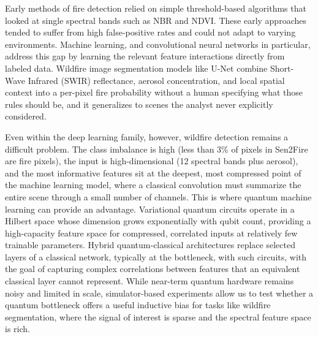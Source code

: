 \documentclass{article}
\begin{document}
Early methods of fire detection relied on simple threshold-based algorithms that looked at single spectral bands such as NBR and NDVI. These early approaches tended to suffer from high false-positive rates and could not adapt to varying environments. Machine learning, and convolutional neural networks in particular, address this gap by learning the relevant feature interactions directly from labeled data. Wildfire image segmentation models like U-Net \cite{unet} combine Short-Wave Infrared (SWIR) reflectance, aerosol concentration, and local spatial context into a per-pixel fire probability without a human specifying what those rules should be, and it generalizes to scenes the analyst never explicitly considered.

Even within the deep learning family, however, wildfire detection remains a difficult problem. The class imbalance is high (less than 3\% of pixels in Sen2Fire are fire pixels), the input is high-dimensional (12 spectral bands plus aerosol), and the most informative features sit at the deepest, most compressed point of the machine learning model, where a classical convolution must summarize the entire scene through a small number of channels. This is where quantum machine learning can provide an advantage. Variational quantum circuits operate in a Hilbert space whose dimension grows exponentially with qubit count, providing a high-capacity feature space for compressed, correlated inputs at relatively few trainable parameters. Hybrid quantum-classical architectures replace selected layers of a classical network, typically at the bottleneck, with such circuits, with the goal of capturing complex correlations between features that an equivalent classical layer cannot represent. While near-term quantum hardware remains noisy and limited in scale, simulator-based experiments allow us to test whether a quantum bottleneck offers a useful inductive bias for tasks like wildfire segmentation, where the signal of interest is sparse and the spectral feature space is rich.
\end{document}
